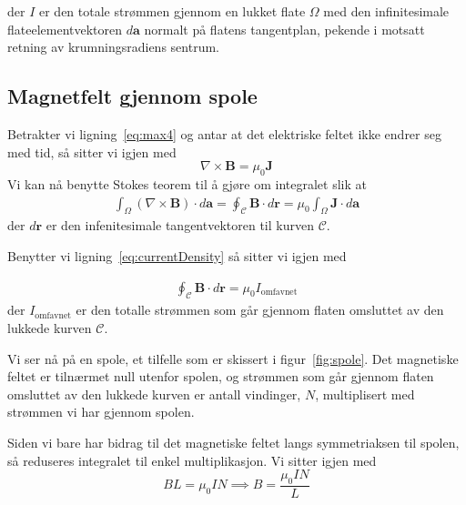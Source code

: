\documentclass[a4paper,11pt, twocolumn]{article}
\begin{document}
der $I$ er den totale strømmen gjennom en lukket flate $\Omega$ med den infinitesimale flateelementvektoren $d\mathbf{a}$ normalt på flatens tangentplan, pekende i motsatt retning av krumningsradiens sentrum. 
\subsection{Magnetfelt gjennom spole}
Betrakter vi ligning~\eqref{eq:max4} og antar at det elektriske feltet ikke endrer seg med tid, så sitter vi igjen med 
\begin{equation}
	\nabla\times\mathbf{B} = \mu_0\mathbf{J}
	\label{eq:independentOfTime}
\end{equation}
Vi kan nå benytte Stokes teorem til å gjøre om integralet slik at
\begin{align}
	\int_\Omega (\nabla\times\mathbf{B})\cdot d\mathbf{a} = \oint_\mathcal{C}\mathbf{B}\cdot d\mathbf{r}=\mu_0\int_\Omega \mathbf{J} \cdot d\mathbf{a} 
	\label{}
\end{align}
der $d\mathbf{r}$ er den infenitesimale tangentvektoren til kurven $\mathcal{C}$. 

Benytter vi ligning~\eqref{eq:currentDensity} så sitter vi igjen med 

\begin{align}
	\oint_\mathcal{C}\mathbf{B}\cdot d\mathbf{r}=\mu_0 I_\text{omfavnet}
	\label{eq:etterStokes}
\end{align}
der $I_\text{omfavnet}$ er den totalle strømmen som går gjennom flaten omsluttet av den lukkede kurven $\mathcal{C}$.

Vi ser nå på en spole, et tilfelle som er skissert i figur~\ref{fig:spole}. Det magnetiske feltet er tilnærmet null utenfor spolen, og strømmen som går gjennom flaten omsluttet av den lukkede kurven er antall vindinger, $N$, multiplisert med strømmen vi har gjennom spolen.

Siden vi bare har bidrag til det magnetiske feltet langs symmetriaksen til spolen, så reduseres integralet til enkel multiplikasjon. Vi sitter igjen med
\begin{equation}
	BL = \mu_0IN \implies B = \frac{\mu_0 I N}{L}
	\label{eq:magSpole}
\end{equation}
\end{document}
